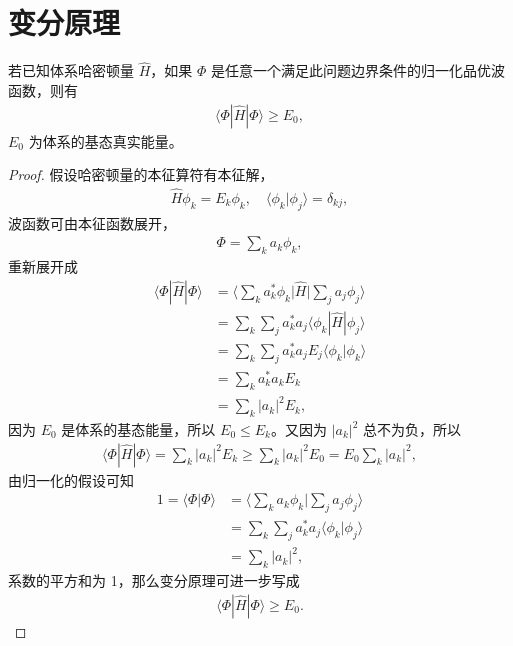 \section{变分原理}
\begin{theorem}
    若已知体系哈密顿量 $\hat H$，如果 $\Phi$ 是任意一个满足此问题边界条件的归一化品优波函数，则有
    \begin{align}
        \langle \Phi | \hat H | \Phi \rangle \geqslant E_0, 
    \end{align}
    $E_0$ 为体系的基态真实能量。
\end{theorem}
\begin{proof}
    假设哈密顿量的本征算符有本征解，
    \begin{align}
        \hat H \phi_k = E_k \phi_k, \quad \langle \phi_k | \phi_j \rangle = \delta_{kj},
    \end{align}
    波函数可由本征函数展开，
    \begin{align}
        \Phi = \sum_k a_k \phi_k, 
    \end{align}
    重新展开成
    \begin{align}
        \langle \Phi | \hat H | \Phi \rangle 
        &= \big\langle \sum_k a_k^* \phi_k \big| \hat H \big| \sum_j a_j \phi_j \big\rangle \\
        &= \sum_k \sum_j a_k^* a_j \langle \phi_k | \hat H | \phi_j \rangle \\
        &= \sum_k \sum_j a_k^* a_j E_j \langle\phi_k | \phi_k \rangle \\
        &= \sum_k a_k^* a_k E_k \\
        &= \sum_k |a_k|^2 E_k,
    \end{align}
    因为 $E_0$ 是体系的基态能量，所以 $E_0 \leqslant E_k$。又因为 $|a_k|^2$ 总不为负，所以
    \begin{align}
        \langle\Phi | \hat H | \Phi \rangle = \sum_k |a_k|^2 E_k \geqslant \sum_k |a_k|^2 E_0 = E_0 \sum_k |a_k|^2, 
    \end{align}
    由归一化的假设可知
    \begin{align}
        1 = \langle\Phi | \Phi\rangle &= \Big\langle \sum_k a_k \phi_k \Big | \sum_j a_j \phi_j \Big\rangle \\
        &=\sum_k\sum_j a_k^* a_j \langle \phi_k|\phi_j \rangle \\
        &= \sum_k |a_k|^2,
    \end{align}
    系数的平方和为 1，那么变分原理可进一步写成
    \begin{align}
        \langle\Phi|\hat H|\Phi\rangle \geqslant E_0.  
    \end{align}
\end{proof}
